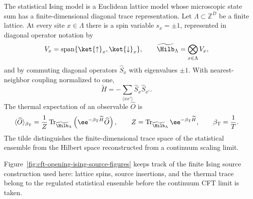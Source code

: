The statistical Ising model is a Euclidean lattice model whose microscopic
state sum has a finite-dimensional diagonal trace representation.  Let
\(\Lambda\subset\mathbb Z^D\) be a finite lattice.  At every site
\(x\in\Lambda\) there is a spin variable \(s_x=\pm1\), represented in diagonal
operator notation by
\[
  V_x=\operatorname{span}\{\ket{\uparrow}_x,\ket{\downarrow}_x\},
  \qquad
  \widetilde{\Hilb}_\Lambda=\bigotimes_{x\in\Lambda}V_x,
\]
and by commuting diagonal operators \(\widehat S_x\) with eigenvalues
\(\pm1\).  With nearest-neighbor coupling normalized to one,
\[
  \widetilde H
  =
  -\sum_{\langle x x'\rangle}\widehat S_x\widehat S_{x'} .
\]
The thermal expectation of an observable \(\widehat O\) is
\begin{equation}
  \langle\widehat O\rangle_{\beta_{\rm T}}
  =
  \frac1Z
  \operatorname{Tr}_{\widetilde{\Hilb}_\Lambda}
  \left(
    \ee^{-\beta_{\rm T}\widetilde H}\widehat O
  \right),
  \qquad
  Z=
  \operatorname{Tr}_{\widetilde{\Hilb}_\Lambda}
  \ee^{-\beta_{\rm T}\widetilde H},
  \qquad
  \beta_{\rm T}=\frac1T .
  \label{eq:cft-opening-ising-thermal-trace}
\end{equation}
The tilde distinguishes the finite-dimensional trace space of the statistical
ensemble from the Hilbert space reconstructed from a continuum scaling limit.

Figure~\ref{fig:cft-opening-ising-source-figures} keeps track of the finite
Ising source construction used here: lattice spins, source insertions, and the
thermal trace belong to the regulated statistical ensemble before the continuum
CFT limit is taken.

